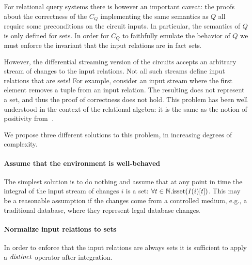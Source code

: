 For relational query systems there is however an important caveat: 
the proofs about the correctness
of the $C_Q$ implementing the same semantics as $Q$ all require some 
preconditions on the circuit inputs.  In particular, the semantics of $Q$
is only defined for sets.  In order for $C_Q$ to faithfully emulate
the behavior of $Q$ we must enforce the invariant that the input
relations are in fact sets.  

However, the differential streaming version of the circuits accepts
an arbitrary stream of changes to the input relations.  Not all
such streams define input relations that are sets!  For example,
consider an input stream where the first element removes a
tuple from an input relation.  The resulting \zr does not represent
a set, and thus the proof of correctness does not hold.
This problem has been well understood in the context of the
relational algebra: it is the same as the notion of positivity from~\cite{green-tcs11}.

We propose three different solutions to this problem, in increasing degrees of complexity.

\paragraph{Assume that the environment is well-behaved}

The simplest solution is to do nothing and assume that at any point in time 
the integral of the input stream of changes $i$ is a set: $\forall t \in \mathbb{N} . \mbox{isset}(\mathit{I}(i)[t])$.
This may be a reasonable assumption if the changes come from a controlled
medium, e.g., a traditional database, where they represent legal database changes.

\paragraph{Normalize input relations to sets}

In order to enforce that the input relations are always sets it is sufficient
to apply a $\mathit{distinct}$ operator after integration.  


